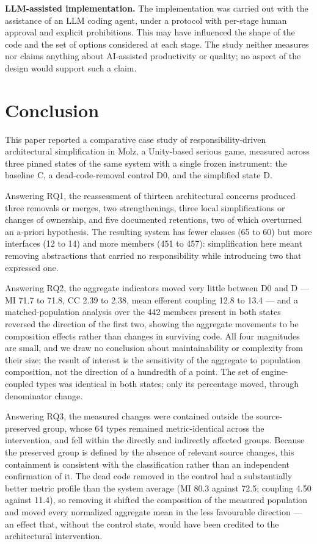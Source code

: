 \documentclass{sbc2019}%
\begin{document}
\medskip\noindent\textbf{LLM-assisted implementation.} The implementation was
carried out with the assistance of an LLM coding agent, under a protocol with
per-stage human approval and explicit prohibitions. This may have influenced the
shape of the code and the set of options considered at each stage. The study
neither measures nor claims anything about AI-assisted productivity or quality;
no aspect of the design would support such a claim.


\section{Conclusion}\label{sec:conclusion}

This paper reported a comparative case study of responsibility-driven
architectural simplification in Molz, a Unity-based serious game, measured across
three pinned states of the same system with a single frozen instrument: the
baseline C, a dead-code-removal control D0, and the simplified state D.

Answering RQ1, the reassessment of thirteen architectural concerns produced three
removals or merges, two strengthenings, three local simplifications or changes of
ownership, and five documented retentions, two of which overturned an a-priori
hypothesis. The resulting system has fewer classes
(65 to 60) but more interfaces (12 to 14) and more members (451 to 457):
simplification here meant removing abstractions that carried no responsibility
while introducing two that expressed one.

Answering RQ2, the aggregate indicators moved very little between D0 and D --- MI
71.7 to 71.8, CC 2.39 to 2.38, mean efferent coupling 12.8 to 13.4 --- and a
matched-population analysis over the 442 members present in both states reversed
the direction of the first two, showing the aggregate movements to be composition
effects rather than changes in surviving code. All four magnitudes are small, and
we draw no conclusion about maintainability or complexity from their size; the
result of interest is the sensitivity of the aggregate to population composition,
not the direction of a hundredth of a point. The set of engine-coupled types
was identical in both states; only its percentage moved, through denominator
change.

Answering RQ3, the measured changes were contained outside the source-preserved
group, whose 64 types remained metric-identical across the intervention, and fell
within the directly and indirectly affected groups. Because the preserved group is
defined by the absence of relevant source changes, this containment is consistent
with the classification rather than an independent confirmation of it. The dead code removed in the control had a substantially better
metric profile than the system average (MI 80.3 against 72.5; coupling 4.50
against 11.4), so removing it shifted the composition of the measured population
and moved every normalized aggregate mean in the less favourable direction --- an
effect that, without the control state, would have been credited to the
architectural intervention.
\end{document}

